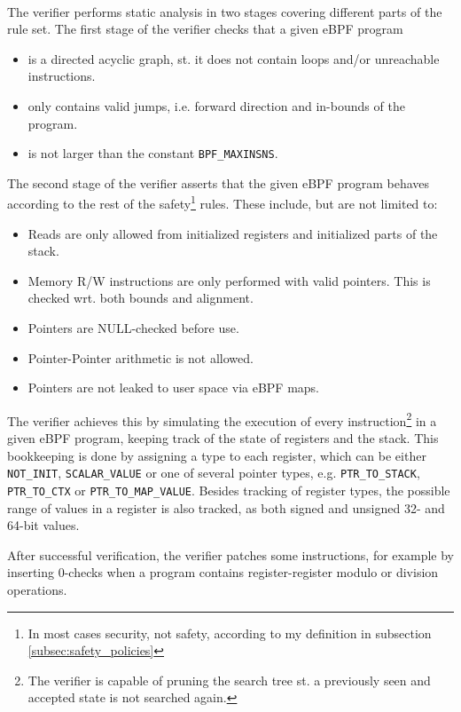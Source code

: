 \paragraph{}
The verifier performs static analysis in two stages covering different parts of the rule set.
The first stage of the verifier checks that a given eBPF program
\begin{itemize}
\item is a directed acyclic graph, st. it does not contain loops and/or unreachable instructions.
\item only contains valid jumps, i.e. forward direction and in-bounds of the program.
\item is not larger than the constant \texttt{BPF\_MAXINSNS}.
\end{itemize}

The second stage of the verifier asserts that the given eBPF program behaves according to the rest of the safety\footnote{In most cases security, not safety, according to my definition in subsection \ref{subsec:safety_policies}} rules. These include, but are not limited to:
\begin{itemize}
\item Reads are only allowed from initialized registers and initialized parts of the stack. 
\item Memory R/W instructions are only performed with valid pointers. This is checked wrt. both bounds and alignment.
\item Pointers are NULL-checked before use. 
\item Pointer-Pointer arithmetic is not allowed.
  \item Pointers are not leaked to user space via eBPF maps. 
\end{itemize}

The verifier achieves this by simulating the execution of every instruction\footnote{The verifier is capable of pruning the search tree st. a previously seen and accepted state is not searched again.} in a given eBPF program, keeping track of the state of registers and the stack. This bookkeeping is done by assigning a type to each register, which can be either \texttt{NOT\_INIT}, \texttt{SCALAR\_VALUE} or one of several pointer types, e.g. \texttt{PTR\_TO\_STACK}, \texttt{PTR\_TO\_CTX} or \texttt{PTR\_TO\_MAP\_VALUE}.
Besides tracking of register types, the possible range of values in a register is also tracked, as both signed and unsigned 32- and 64-bit values.


After successful verification, the verifier patches some instructions, for example by inserting 0-checks when a program contains register-register modulo or division operations.


